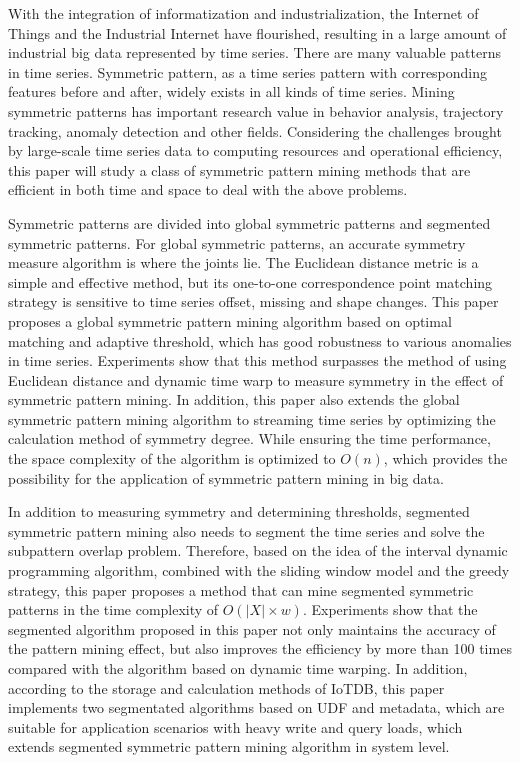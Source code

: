 \begin{abstract*}
  With the integration of informatization and 
  industrialization, the Internet of Things and 
  the Industrial Internet have flourished, resulting in a 
  large amount of industrial big data represented by time 
  series. There are many valuable patterns in time series. 
  Symmetric pattern, as a time series pattern with 
  corresponding features before and after, widely exists 
  in all kinds of time series. Mining symmetric patterns 
  has important research value in behavior analysis, 
  trajectory tracking, anomaly detection and other fields. 
  Considering the challenges brought by large-scale time 
  series data to computing resources and operational 
  efficiency, this paper will study a class of symmetric 
  pattern mining methods that are efficient in both time 
  and space to deal with the above problems.

  Symmetric patterns are divided into global symmetric 
  patterns and segmented symmetric patterns. For global 
  symmetric patterns, an accurate symmetry measure algorithm 
  is where the joints lie. The Euclidean distance metric 
  is a simple and effective method, but its one-to-one 
  correspondence point matching strategy is sensitive to 
  time series offset, missing and shape changes. This paper 
  proposes a global symmetric pattern mining algorithm based 
  on optimal matching and adaptive threshold, which has good 
  robustness to various anomalies in time series. 
  Experiments show that this method surpasses the method of 
  using Euclidean distance and dynamic time warp to measure 
  symmetry in the effect of symmetric pattern mining. In 
  addition, this paper also extends the global symmetric 
  pattern mining algorithm to streaming time series by 
  optimizing the calculation method of symmetry degree. 
  While ensuring the time performance, the space complexity 
  of the algorithm is optimized to $O(n)$, which provides 
  the possibility for the application of symmetric pattern 
  mining in big data.

  In addition to measuring symmetry and determining 
  thresholds, segmented symmetric pattern mining also 
  needs to segment the time series and solve the subpattern 
  overlap problem. Therefore, based on the idea of the 
  interval dynamic programming algorithm, combined with 
  the sliding window model and the greedy strategy, 
  this paper proposes a method that can mine segmented 
  symmetric patterns in the time complexity 
  of $O\left( \left| X \right| \times w \right)$. 
  Experiments show that the segmented algorithm proposed 
  in this paper not only maintains the accuracy of the 
  pattern mining effect, but also improves the efficiency 
  by more than 100 times compared with the algorithm 
  based on dynamic time warping. In addition, 
  according to the storage and calculation methods of IoTDB, 
  this paper implements two segmentated algorithms 
  based on UDF and metadata, which are suitable for 
  application scenarios with heavy write and 
  query loads, which extends segmented symmetric 
  pattern mining algorithm in system level.


\end{abstract*}
